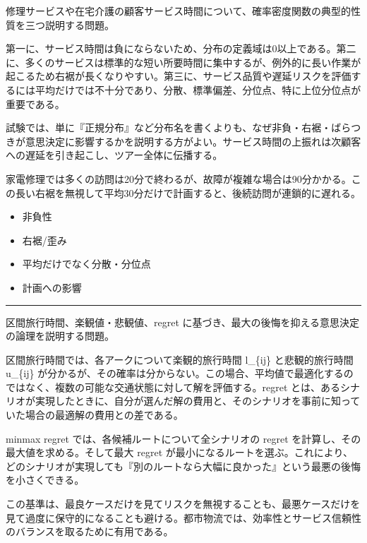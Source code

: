 \clearpage
{}
修理サービスや在宅介護の顧客サービス時間について、確率密度関数の典型的性質を三つ説明する問題。\par
{}
第一に、サービス時間は負にならないため、分布の定義域は0以上である。第二に、多くのサービスは標準的な短い所要時間に集中するが、例外的に長い作業が起こるため右裾が長くなりやすい。第三に、サービス品質や遅延リスクを評価するには平均だけでは不十分であり、分散、標準偏差、分位点、特に上位分位点が重要である。\par
試験では、単に『正規分布』など分布名を書くよりも、なぜ非負・右裾・ばらつきが意思決定に影響するかを説明する方がよい。サービス時間の上振れは次顧客への遅延を引き起こし、ツアー全体に伝播する。\par
{}
家電修理では多くの訪問は20分で終わるが、故障が複雑な場合は90分かかる。この長い右裾を無視して平均30分だけで計画すると、後続訪問が連鎖的に遅れる。\par
{}
\begin{itemize}
\item 非負性
\item 右裾/歪み
\item 平均だけでなく分散・分位点
\item 計画への影響
\end{itemize}
\vspace{2mm}\hrule\vspace{2mm}
区間旅行時間、楽観値・悲観値、regret に基づき、最大の後悔を抑える意思決定の論理を説明する問題。\par
{}
区間旅行時間では、各アークについて楽観的旅行時間 l\_\{ij\} と悲観的旅行時間 u\_\{ij\} が分かるが、その確率は分からない。この場合、平均値で最適化するのではなく、複数の可能な交通状態に対して解を評価する。regret とは、あるシナリオが実現したときに、自分が選んだ解の費用と、そのシナリオを事前に知っていた場合の最適解の費用との差である。\par
minmax regret では、各候補ルートについて全シナリオの regret を計算し、その最大値を求める。そして最大 regret が最小になるルートを選ぶ。これにより、どのシナリオが実現しても『別のルートなら大幅に良かった』という最悪の後悔を小さくできる。\par
この基準は、最良ケースだけを見てリスクを無視することも、最悪ケースだけを見て過度に保守的になることも避ける。都市物流では、効率性とサービス信頼性のバランスを取るために有用である。\par
